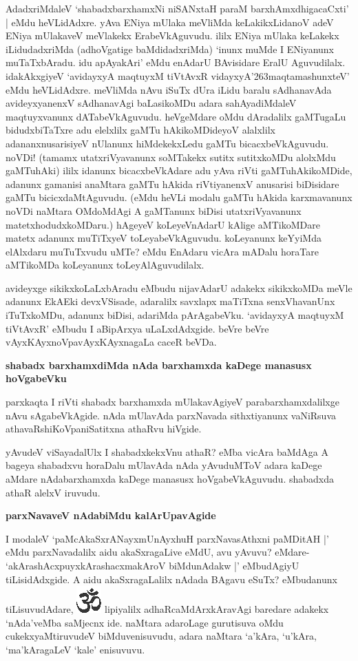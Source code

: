 \noindent
AdadxriMdaleV `shabadxbarxhamxNi niSANxtaH paraM barxhAmxdhigacaCxti' | eMdu heVLidAdxre. yAva ENiya mU\-laka meVliMda keLakikxLidanoV adeV ENiya mUlakaveV meVlakekx ErabeVkAguvudu. ililx ENiya mU\-laka keLakekx iLidudadxriMda (adhoVgatige baMdidadxriMda) `inunx muMde I ENiyanunx muTaTx\-bAradu. idu apAyakAri' eMdu enAdarU BAvisidare EralU Aguvudilalx. idakAkxgiyeV `avidayxyA maqtuyxM\- tiVtAvxR\label{160} vidayxyA\char'263maqtamashunxteV' eMdu heVLidAdxre. meVliMda nAvu iSuTx dUra iLidu baralu\- sAdhanavAda avideyxyanenxV sAdhanavAgi baLasikoMDu adara sahAyadiMdaleV maqtuyxvanunx dATa\-beVkAguvudu. heVgeMdare oMdu dAradalilx gaMTugaLu bidudxbiTaTxre adu elelxlilx gaMTu hAkikoMDi\-deyoV alalxlilx adananxnusarisiyeV nUlanunx hiMdekekxLedu gaMTu bicacxbeVkAguvudu. noVDi! (tamamx utatxriVyavanunx soMTakekx sutitx sutitxkoMDu alolxMdu gaMTuhAki) ililx idanunx bicacxbeVkAdare adu yAva riVti gaMTuhAkikoMDide, adanunx gamanisi anaMtara gaMTu hAkida riVtiyanenxV anusarisi biDisi\-dare gaMTu bicicxdaMtAguvudu. (eMdu heVLi modalu gaMTu hAkida karxmavanunx noVDi naMtara\- OMdoM\-dAgi A gaMTanunx biDisi utatxriVyavanunx matetxhodudxkoMDaru.) hAgeyeV koLeyeVnAdarU kAlige aMTikoMDare matetx adanunx muTiTxyeV toLeyabeVkAguvudu. koLeyanunx keYyiMda elAlx\-daru muTuTxvudu uMTe? eMdu EnAdaru vicAra mADalu horaTare aMTikoMDa koLe\-yanunx toLeyAlAguvudilalx.

avideyxge sikikxkoLaLxbAradu eMbudu nijavAdarU adakekx sikikxkoMDa meVle adanunx EkAEki devxVSi\-sade, adaralilx savxlapx maTiTxna senxVhavanUnx iTuTxkoMDu, adanunx biDisi, adariMda pArAgabeVku. `avi\-dayxyA maqtuyxM tiVtAvxR'\label{161} eMbudu I aBipArxya uLaLxdAdxgide. beVre beVre vAyxKAyxnoVpavAyxKAyxna\-gaLa caceR beVDa.

{\bigskip
\noindent
{\large\bf shabadx barxhamxdiMda nAda barxhamxda kaDege manasusx hoVgabeVku}}\label{page161}
\medskip

\noindent
parxkaqta I riVti shabadx barxhamxda mUlakavAgiyeV parabarxhamxdalilxge nAvu sAgabeVkAgide. nAda mUla\-vAda parxNavada sithxtiyanunx vaNiRsuva athavaRshiKoVpaniSatitxna athaRvu hiVgide.

yAvudeV viSayadalUlx I shabadxkekxVnu athaR? eMba vicAra baMdAga A bageya shabadxvu hora\-Dalu mUlavAda nAda yAvuduMToV adara kaDege aMdare nAdabarxhamxda kaDege manasusx hoVga\-beVkAgu\-vudu. shabadxda athaR alelxV iruvudu.

{\bigskip
\noindent
{\large\bf parxNavaveV nAdabiMdu kalArUpavAgide}}\label{page161}
\medskip

\noindent
I modaleV `paMcAkaSxrANayxmUnAyxhuH parxNavasAthxni paMDitAH |' eMdu parxNavadalilx aidu akaSxra\-gaLive eMdU, avu yAvuvu? eMdare- `akArashAcxpuyxkArashacxmakAroV biMdunAdakw |' eMbudA\-giyU tiLisidAdxgide. A aidu akaSxragaLalilx nAdada BAgavu eSuTx? eMbudanunx tiLisuvudAdare, {\includegraphics[scale=.6]{om.eps}} lipiyalilx adhaRcaMdArxkAravAgi baredare adakekx `nAda'veMba saMjecnx ide. naMtara adaroLage gurutisuva oMdu cukekxyaMtiruvudeV biMduvenisuvudu, adara naMtara `a'kAra, `u'kAra, `ma'kAragaLeV `kale' enisuvuvu. 

